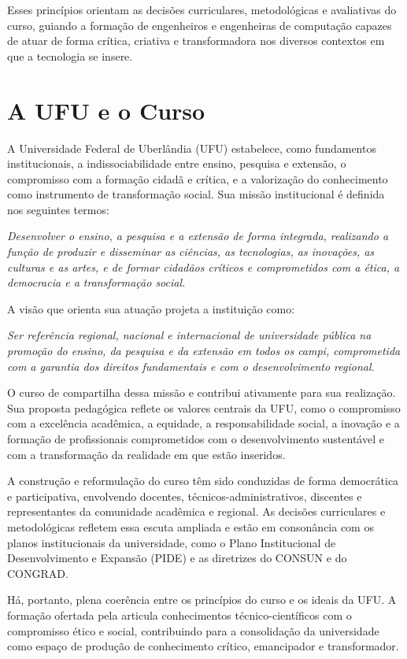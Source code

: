 Esses princípios orientam as decisões curriculares, metodológicas e avaliativas do curso, guiando a formação de engenheiros e engenheiras de computação capazes de atuar de forma crítica, criativa e transformadora nos diversos contextos em que a tecnologia se insere.

\section{A UFU e o Curso}

A Universidade Federal de Uberlândia (UFU) estabelece, como fundamentos institucionais, a indissociabilidade entre ensino, pesquisa e extensão, o compromisso com a formação cidadã e crítica, e a valorização do conhecimento como instrumento de transformação social. Sua missão institucional é definida nos seguintes termos:

\begin{displayquote}
\textit{Desenvolver o ensino, a pesquisa e a extensão de forma integrada, realizando a função de produzir e disseminar as ciências, as tecnologias, as inovações, as culturas e as artes, e de formar cidadãos críticos e comprometidos com a ética, a democracia e a transformação social.}
\end{displayquote}

A visão que orienta sua atuação projeta a instituição como:

\begin{displayquote}
\textit{Ser referência regional, nacional e internacional de universidade pública na promoção do ensino, da pesquisa e da extensão em todos os campi, comprometida com a garantia dos direitos fundamentais e com o desenvolvimento regional.}
\end{displayquote}

O curso de \nomecursonovo compartilha dessa missão e contribui ativamente para sua realização. Sua proposta pedagógica reflete os valores centrais da UFU, como o compromisso com a excelência acadêmica, a equidade, a responsabilidade social, a inovação e a formação de profissionais comprometidos com o desenvolvimento sustentável e com a transformação da realidade em que estão inseridos.

A construção e reformulação do curso têm sido conduzidas de forma democrática e participativa, envolvendo docentes, técnicos-administrativos, discentes e representantes da comunidade acadêmica e regional. As decisões curriculares e metodológicas refletem essa escuta ampliada e estão em consonância com os planos institucionais da universidade, como o Plano Institucional de Desenvolvimento e Expansão (PIDE) e as diretrizes do CONSUN e do CONGRAD.

Há, portanto, plena coerência entre os princípios do curso e os ideais da UFU. A formação ofertada pela \nomecursonovo articula conhecimentos técnico-científicos com o compromisso ético e social, contribuindo para a consolidação da universidade como espaço de produção de conhecimento crítico, emancipador e transformador.